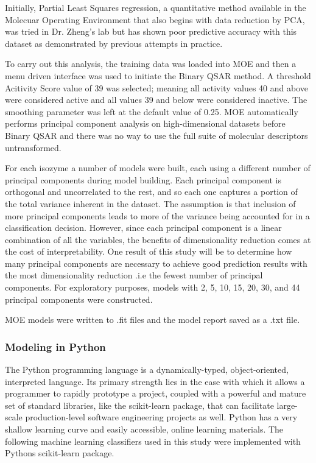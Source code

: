 Initially, Partial Least Squares regression, a quantitative method available in the Molecuar Operating Environment that also begins with data reduction by PCA, was tried in Dr. Zheng's lab but has shown poor predictive accuracy with this dataset as demonstrated by previous attempts in practice.

To carry out this analysis, the training data was loaded into MOE and then a menu driven interface was used to initiate the Binary QSAR method. A threshold Acitivity Score value of 39 was selected; meaning all activity values 40 and above were considered active and all values 39 and below were considered inactive. The smoothing parameter was left at the default value of 0.25. MOE automatically performs principal component analysis on high-dimensional datasets before Binary QSAR and there was no way to use the full suite of molecular descriptors untransformed.

For each isozyme a number of models were built, each using a different number of principal components during model building.  Each principal component is orthogonal and uncorrelated to the rest, and so each one captures a portion of the total variance inherent in the dataset. The assumption is that inclusion of more principal components leads to more of the variance being accounted for in a classification decision. However, since each principal component is a linear combination of all the variables, the benefits of dimensionality reduction comes at the cost of interpretability. One result of this study will be to determine how many principal components are necessary to achieve good prediction results with the most dimensionality reduction .i.e the fewest number of principal components.  For exploratory purposes, models with 2, 5, 10, 15, 20, 30, and 44 principal components were constructed. 

MOE models were written to .fit files and the model report saved as a .txt file.

\subsubsection{Modeling in Python}
The Python programming language is a dynamically-typed, object-oriented, interpreted language. Its primary strength lies in the ease with which it allows a programmer to rapidly prototype a project, coupled with a powerful and mature set of standard libraries, like the scikit-learn package, that can facilitate large-scale production-level software engineering projects as well. Python has a very shallow learning curve and easily accessible, online learning materials. The following machine learning classifiers used in this study were implemented with Pythons scikit-learn package.

